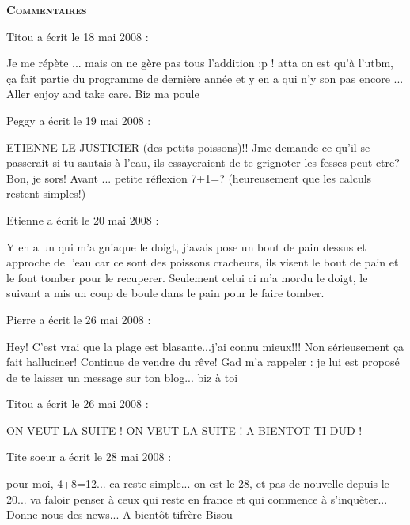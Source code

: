 \bigskip
\textbf{\textsc{Commentaires}}

 \medskip
Titou a écrit le 18 mai 2008 :
\begin{displayquote}
Je me répète ... mais on ne gère pas tous l'addition :p ! atta on est qu'à l'utbm, ça fait partie du programme de dernière année  et y en a qui n'y son pas encore ...
Aller enjoy and take care. Biz ma poule
\end{displayquote}

 \medskip
Peggy a écrit le 19 mai 2008 :
\begin{displayquote}
ETIENNE LE JUSTICIER (des petits poissons)!! 
Jme demande ce qu'il se passerait si tu sautais à l'eau, ils essayeraient de te grignoter les fesses peut etre?
Bon, je sors!
Avant ... petite réflexion 7+1=? (heureusement que les calculs restent simples!)
\end{displayquote}

 \medskip
Etienne a écrit le 20 mai 2008 :
\begin{displayquote}
Y en a un qui m'a gniaque le doigt, j'avais pose un bout de pain dessus et approche de l'eau car ce sont des poissons cracheurs, ils visent le bout de pain et le font tomber pour le recuperer. Seulement celui ci m'a mordu le doigt, le suivant a mis un coup de boule dans le pain pour le faire tomber.
\end{displayquote}

 \medskip
Pierre a écrit le 26 mai 2008 :
\begin{displayquote}
Hey!
C'est vrai que la plage est blasante...j'ai connu mieux!!!
Non sérieusement ça fait halluciner!
Continue de vendre du rêve!
Gad m'a rappeler : je lui est proposé de te laisser un message sur ton blog...
biz à toi
\end{displayquote}

 \medskip
Titou a écrit le 26 mai 2008 :
\begin{displayquote}
ON VEUT LA SUITE ! ON VEUT LA SUITE !
A BIENTOT TI DUD !
\end{displayquote}

 \medskip
Tite soeur a écrit le 28 mai 2008 :
\begin{displayquote}
pour moi, 4+8=12... ca reste simple...
on est le 28, et pas de nouvelle depuis le 20... va faloir penser à ceux qui reste en france et qui commence à s'inquèter...
Donne nous des news...
A bientôt tifrère
Bisou
\end{displayquote}

